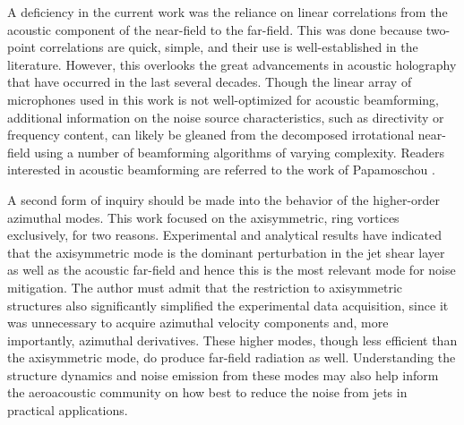 A deficiency in the current work was the reliance on linear correlations from the acoustic component of the near-field to the far-field.
This was done because two-point correlations are quick, simple, and their use is well-established in the literature.
However, this overlooks the great advancements in acoustic holography that have occurred in the last several decades.
Though the linear array of microphones used in this work is not well-optimized for acoustic beamforming, additional information on the noise source characteristics, such as directivity or frequency content, can likely be gleaned from the decomposed irrotational near-field using a number of beamforming algorithms of varying complexity.
Readers interested in acoustic beamforming are referred to the work of Papamoschou \citep{Papamoschou2011}.

A second form of inquiry should be made into the behavior of the higher-order azimuthal modes.
This work focused on the axisymmetric, ring vortices exclusively, for two reasons.
Experimental and analytical results have indicated that the axisymmetric mode is the dominant perturbation in the jet shear layer as well as the acoustic far-field and hence this is the most relevant mode for noise mitigation.
The author must admit that the restriction to axisymmetric structures also significantly simplified the experimental data acquisition, since it was unnecessary to acquire azimuthal velocity components and, more importantly, azimuthal derivatives.
These higher modes, though less efficient than the axisymmetric mode, do produce far-field radiation as well.
Understanding the structure dynamics and noise emission from these modes may also help inform the aeroacoustic community on how best to reduce the noise from jets in practical applications.